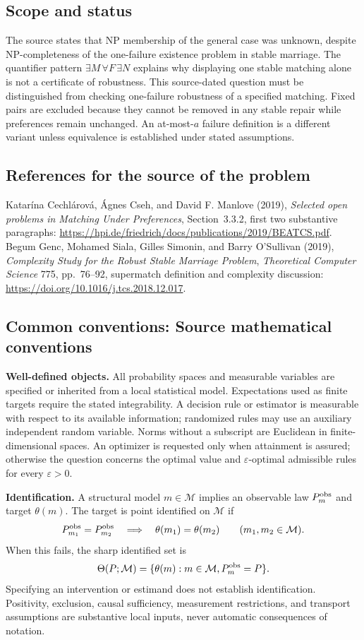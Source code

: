 \documentclass[11pt,a4paper]{article}
\begin{document}
\subsection*{Scope and status}
The source states that NP membership of the general case was unknown, despite NP-completeness of the one-failure existence problem in stable marriage. The quantifier pattern $\exists M\,\forall F\,\exists N$ explains why displaying one stable matching alone is not a certificate of robustness. This source-dated question must be distinguished from checking one-failure robustness of a specified matching. Fixed pairs are excluded because they cannot be removed in any stable repair while preferences remain unchanged. An at-most-$a$ failure definition is a different variant unless equivalence is established under stated assumptions.
\subsection*{References for the source of the problem}
Katar\'ina Cechl\'arov\'a, \'Agnes Cseh, and David F. Manlove (2019), \emph{Selected open problems in Matching Under Preferences}, Section~3.3.2, first two substantive paragraphs: \url{https://hpi.de/friedrich/docs/publications/2019/BEATCS.pdf}. Begum Genc, Mohamed Siala, Gilles Simonin, and Barry O'Sullivan (2019), \emph{Complexity Study for the Robust Stable Marriage Problem}, \emph{Theoretical Computer Science} 775, pp.~76--92, supermatch definition and complexity discussion: \url{https://doi.org/10.1016/j.tcs.2018.12.017}.

\subsection*{Common conventions: Source mathematical conventions}

\textbf{Well-defined objects.}
All probability spaces and measurable variables are specified or inherited
from a local statistical model. Expectations used as finite targets require
the stated integrability. A decision rule or estimator is measurable with
respect to its available information; randomized rules may use an auxiliary
independent random variable. Norms without a subscript are Euclidean in
finite-dimensional spaces. An optimizer is requested only when attainment
is assured; otherwise the question concerns the optimal value and
$\varepsilon$-optimal admissible rules for every $\varepsilon>0$.

\textbf{Identification.}
A structural model $m\in\mathcal M$ implies an observable law
$P_m^{\rm obs}$ and target $\theta(m)$. The target is point identified on
$\mathcal M$ if
\[
 P_{m_1}^{\rm obs}=P_{m_2}^{\rm obs}
 \quad\Longrightarrow\quad\theta(m_1)=\theta(m_2)
 \qquad(m_1,m_2\in\mathcal M).
\]
When this fails, the sharp identified set is
\[
 \Theta(P;\mathcal M)=\{\theta(m):m\in\mathcal M,
                                  P_m^{\rm obs}=P\}.
\]
Specifying an intervention or estimand does not establish identification.
Positivity, exclusion, causal sufficiency, measurement restrictions, and
transport assumptions are substantive local inputs, never automatic
consequences of notation.
\end{document}

